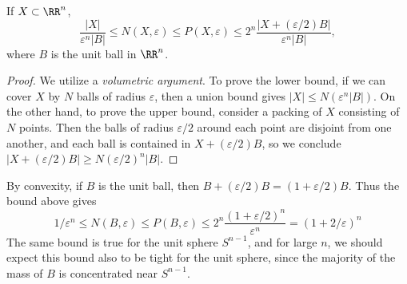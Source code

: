 \begin{lemma}
    If $X \subset \RR^n$,
    \[ \frac{|X|}{\varepsilon^n |B|} \leq N(X,\varepsilon) \leq P(X,\varepsilon) \leq 2^n \frac{|X + (\varepsilon/2) B|}{\varepsilon^n|B|}, \]
    where $B$ is the unit ball in $\RR^n$.
\end{lemma}
\begin{proof}
    We utilize a {\it volumetric argument}. To prove the lower bound, if we can cover $X$ by $N$ balls of radius $\varepsilon$, then a union bound gives $|X| \leq N (\varepsilon^n |B|)$. On the other hand, to prove the upper bound, consider a packing of $X$ consisting of $N$ points. Then the balls of radius $\varepsilon/2$ around each point are disjoint from one another, and each ball is contained in $X + (\varepsilon/2)B$, so we conclude $|X + (\varepsilon/2)B| \geq N(\varepsilon/2)^n |B|$. 
\end{proof}

\begin{example}
    By convexity, if $B$ is the unit ball, then $B + (\varepsilon/2) B = (1 + \varepsilon/2) B$. Thus the bound above gives
    \[ 1/\varepsilon^n \leq N(B,\varepsilon) \leq P(B,\varepsilon) \leq 2^n \frac{(1 + \varepsilon/2)^n}{\varepsilon^n} = (1 + 2/\varepsilon)^n \]
    The same bound is true for the unit sphere $S^{n-1}$, and for large $n$, we should expect this bound also to be tight for the unit sphere, since the majority of the mass of $B$ is concentrated near $S^{n-1}$.
\end{example}

